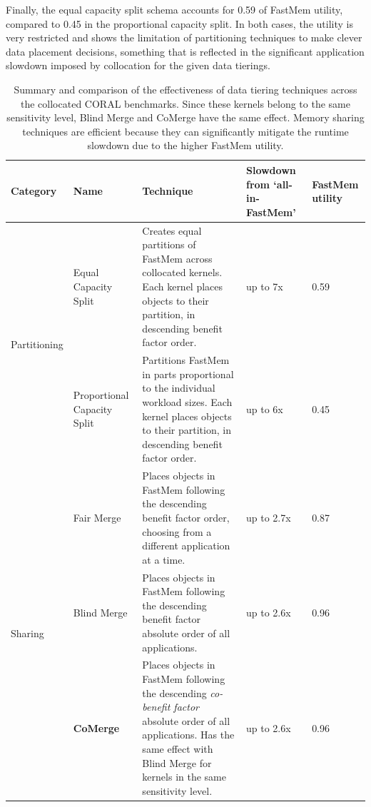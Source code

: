Finally, the equal capacity split schema accounts for 0.59 of FastMem utility, compared to 0.45 in the proportional capacity split. In both cases, the utility is very restricted and shows the limitation of partitioning techniques to make clever data placement decisions, something that is reflected in the significant application slowdown imposed by collocation for the given data tierings.
 
 \begin{table}[t]
\centering
  \begin{tabular}{|p{1.5cm}|p{2cm}|p{9cm}|p{2.2cm}|p{1.2cm}|} \hline
	Category & Name & Technique & Slowdown from `all-in-FastMem' & FastMem utility    \\\hline \hline
    \multirow{2}{*}{Partitioning} & Equal Capacity Split & Creates equal partitions of FastMem across collocated kernels. Each kernel places objects to their partition, in descending benefit factor order.  & up to 7x & 0.59 \\\cline{2-5}
    & Proportional Capacity Split & Partitions FastMem in parts proportional to the individual workload sizes. Each kernel places objects to their partition, in descending benefit factor order. & up to 6x & 0.45\\\hline
        \multirow{3}{*}{Sharing} & Fair Merge & Places objects in FastMem following the descending benefit factor order, choosing from a different application at a time.  & up to 2.7x & 0.87\\\cline{2-5}
    & Blind Merge & Places objects in FastMem following the descending benefit factor absolute order of all applications. & up to 2.6x & 0.96 \\\cline{2-5}
    & {\bf CoMerge} & Places objects in FastMem following the descending {\it co-benefit factor} absolute order of all applications. Has the same effect with Blind Merge for kernels in the same sensitivity level. & up to 2.6x & 0.96 \\\hline
  \end{tabular}
  \caption{Summary and comparison of the effectiveness of data tiering techniques across the collocated CORAL benchmarks. Since these kernels belong to the same sensitivity level, Blind Merge and CoMerge have the same effect. Memory sharing techniques are efficient because they can significantly mitigate the runtime slowdown due to the higher FastMem utility.}
  \label{tbl:tiering_summary}
    \vspace{-0.3in}
\end{table}


